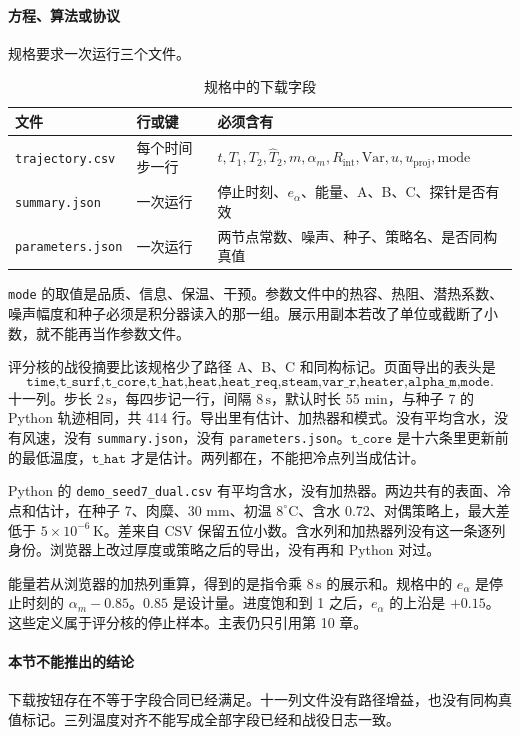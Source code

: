 \paragraph{方程、算法或协议}
规格要求一次运行三个文件。

\begin{table}[ht]
\centering
\caption{规格中的下载字段}
\begin{tabularx}{\textwidth}{llX}
\toprule
文件 & 行或键 & 必须含有 \\
\midrule
\texttt{trajectory.csv} & 每个时间步一行 & $t,T_1,T_2,\hat T_2,m,\alpha_m,R_{\mathrm{int}},\mathrm{Var},u,u_{\mathrm{proj}},\mathrm{mode}$ \\
\texttt{summary.json} & 一次运行 & 停止时刻、$e_{\alpha}$、能量、A、B、C、探针是否有效 \\
\texttt{parameters.json} & 一次运行 & 两节点常数、噪声、种子、策略名、是否同构真值 \\
\bottomrule
\end{tabularx}
\end{table}

\texttt{mode} 的取值是品质、信息、保温、干预。参数文件中的热容、热阻、潜热系数、噪声幅度和种子必须是积分器读入的那一组。展示用副本若改了单位或截断了小数，就不能再当作参数文件。

评分核的战役摘要比该规格少了路径 A、B、C 和同构标记。页面导出的表头是
\[
\texttt{time,t\_surf,t\_core,t\_hat,heat,heat\_req,steam,var\_r,heater,alpha\_m,mode}.
\]
十一列。步长 \(2\,\mathrm{s}\)，每四步记一行，间隔 \(8\,\mathrm{s}\)，默认时长 55 min，与种子 7 的 Python 轨迹相同，共 414 行。导出里有估计、加热器和模式。没有平均含水，没有风速，没有 \texttt{summary.json}，没有 \texttt{parameters.json}。\(\texttt{t\_core}\) 是十六条里更新前的最低温度，\(\texttt{t\_hat}\) 才是估计。两列都在，不能把冷点列当成估计。

Python 的 \texttt{demo\_seed7\_dual.csv} 有平均含水，没有加热器。两边共有的表面、冷点和估计，在种子 7、肉糜、30 mm、初温 \(8^\circ\mathrm{C}\)、含水 0.72、对偶策略上，最大差低于 \(5\times 10^{-6}\,\mathrm{K}\)。差来自 CSV 保留五位小数。含水列和加热器列没有这一条逐列身份。浏览器上改过厚度或策略之后的导出，没有再和 Python 对过。

能量若从浏览器的加热列重算，得到的是指令乘 \(8\,\mathrm{s}\) 的展示和。规格中的 \(e_\alpha\) 是停止时刻的 \(\alpha_m-0.85\)。\(0.85\) 是设计量。进度饱和到 1 之后，\(e_\alpha\) 的上沿是 \(+0.15\)。这些定义属于评分核的停止样本。主表仍只引用第 10 章。

\paragraph{本节不能推出的结论}
下载按钮存在不等于字段合同已经满足。十一列文件没有路径增益，也没有同构真值标记。三列温度对齐不能写成全部字段已经和战役日志一致。

